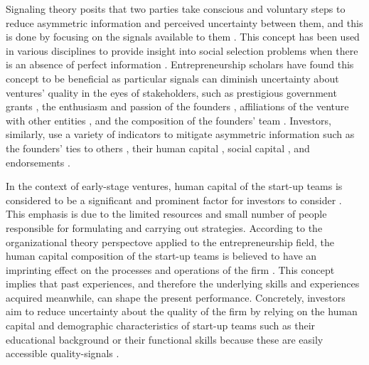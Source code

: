 \documentclass[12pt]{article}
\begin{document}
Signaling theory posits that two parties take conscious and voluntary steps to reduce asymmetric information and perceived uncertainty between them, and this is done by focusing on the signals available to them \citep{spence1974market}. This concept has been used in various disciplines to provide insight into social selection problems when there is an absence of perfect information \citep{connelly2011signaling, colombo2021use}. Entrepreneurship scholars have found this concept to be beneficial as particular signals can diminish uncertainty about ventures' quality in the eyes of stakeholders, such as prestigious government grants \citep{islam2018signaling}, the enthusiasm and passion of the founders \citep{chen2009entrepreneur}, affiliations of the venture with other entities \citep{plummer2016better}, and the composition of the founders' team \citep{ko2018signaling}. Investors, similarly, use a variety of indicators to mitigate asymmetric information such as the founders' ties to others \citep{shane2002network}, their human capital \citep{beckman2007early}, social capital \citep{shane2002organizational}, and endorsements \citep{courtney2017resolving, janney2006moderating, plummer2016better}.

In the context of early-stage ventures, human capital of the start-up teams is considered to be a significant and prominent factor for investors to consider \citep{beckman2007early, ko2018signaling, matusik2008values}. This emphasis is due to the limited resources and small number of people responsible for formulating and carrying out strategies. According to the organizational theory perspectove applied to the entrepreneurship field, the human capital composition of the start-up teams is believed to have an imprinting effect on the processes and operations of the firm \citep{packalen2007complementing}. This concept implies that past experiences, and therefore the underlying skills and experiences acquired meanwhile, can shape the present performance. Concretely, investors aim to reduce uncertainty about the quality of the firm by relying on the human capital and demographic characteristics of start-up teams such as their educational background or their functional skills because these are easily accessible quality-signals \citep{colombo2005founders, beckman2007early, eddleston2016you, plummer2016better}.
\end{document}
